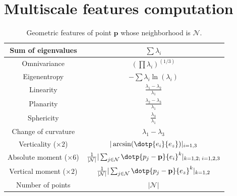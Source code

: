 \documentclass[a4paper, 11pt]{article}
\begin{document}
\section{Multiscale features computation}
\begin{table}[H]
    \centering
    \begin{tabular}{|c||c|}
    \hline   
    Sum of eigenvalues & $\sum \lambda_i$ \\[1ex]
    \hline
    Omnivariance & $(\prod \lambda_i)^{(1/3)}$\\[1ex]
    \hline
    Eigenentropy & $-\sum \lambda_i \ln(\lambda_i)$\\[1ex]
    \hline
    Linearity & $\frac{\lambda_1 - \lambda_2}{\lambda_1}$\\[1ex]
    \hline
    Planarity & $\frac{\lambda_2 - \lambda_3}{\lambda_1}$\\[1ex]
    \hline
    Sphericity & $\frac{\lambda_3}{\lambda_1}$\\[1ex]
    \hline
    Change of curvature & $\lambda_1 - \lambda_3$\\[1ex]
    \hline
    Verticality ($\times2$) & $|\arcsin(\dotp{e_i}{e_z})|_{i=1, 3}$ \\[1ex]
    \hline
    Absolute moment ($\times6$) & $\frac{1}{|\mathcal{N}|}|\sum_{j\in\mathcal{N}} \dotp{p_j - \mathbf{p}}{e_i}^k|_{k = 1, 2;\; i = 1, 2, 3}$\\[1ex]
    \hline  
    Vertical moment ($\times2$) & $\frac{1}{|\mathcal{N}|}|\sum_{j\in\mathcal{N}} \dotp{p_j - \mathbf{p}}{e_z}^k|_{k=1, 2}$ \\[1ex]
    \hline
    Number of points & $|\mathcal{N}|$\\[1ex]
    \hline
    \end{tabular}
    \caption{Geometric features \cite{thomas_semantic_2018} of point $\mathbf{p}$ whose neighborhood is $\mathcal{N}$.}
    \label{tab:thomas_feat}
\end{table}
\end{document}
